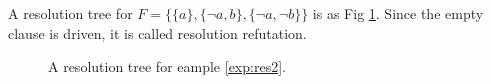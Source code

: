 \documentclass[12pt]{book}
\begin{document}
\begin{examp}\label{exp:res2}
      A resolution tree for $F = \{\{a\},\{\neg a,b\},\{\neg a, \neg b\}\}$ is as Fig \ref{fig:resol2}. Since the empty clause 
	  is driven, it is called resolution refutation.
	  \begin{figure}[h]
       \centering
	   \caption{A resolution tree for eample  \ref{exp:res2}.}
	   \label{fig:resol2}
       \end{figure}
\end{examp}
 
\end{document}
